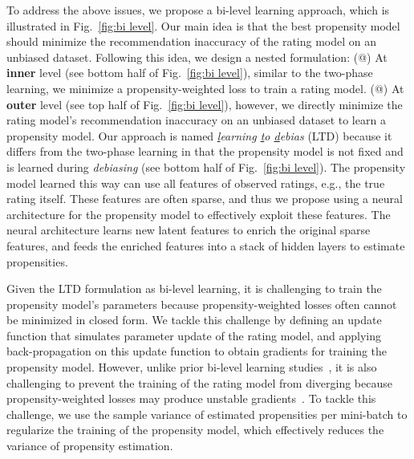 \documentclass[letterpaper]{article} %
\makeatletter
\newcommand*{\myroman}[1]{\expandafter\@slowromancap\romannumeral #1@}
\makeatother
\begin{document}
To address the above issues, we propose a bi-level learning approach, which is illustrated in Fig.~\ref{fig:bi level}.
Our main idea is that the best propensity model should minimize the recommendation inaccuracy of the rating model on an unbiased dataset.
Following this idea, we design a nested formulation:
(\myroman{1}) At \textbf{inner} level (see bottom half of Fig.~\ref{fig:bi level}), similar to the two-phase learning, we minimize a propensity-weighted loss to train a rating model.
(\myroman{2}) At \textbf{outer} level (see top half of Fig.~\ref{fig:bi level}), however, we directly minimize the rating model's recommendation inaccuracy on an unbiased dataset to learn a propensity model.
Our approach is named \emph{\underline{l}earning \underline{t}o \underline{d}ebias} (LTD) because it differs from the two-phase learning in that the propensity model is not fixed and is learned during \emph{debiasing} (see bottom half of Fig.~\ref{fig:bi level}).
The propensity model learned this way can use all features of observed ratings, e.g., the true rating itself.
These features are often sparse, and thus we propose using a neural architecture for the propensity model to effectively exploit these features.
The neural architecture learns new latent features to enrich the original sparse features, and feeds the enriched features into a stack of hidden layers to estimate propensities.

Given the LTD formulation as bi-level learning, it is challenging to train the propensity model's parameters because propensity-weighted losses often cannot be minimized in closed form.
We tackle this challenge by defining an update function that simulates parameter update of the rating model, and applying back-propagation on this update function to obtain gradients for training the propensity model.
However, unlike prior bi-level learning studies~\cite{franceschi2017forward}, it is also challenging to prevent the training of the rating model from diverging because propensity-weighted losses may produce unstable gradients~\cite{swaminathan2015counterfactual}.
To tackle this challenge, we use the sample variance of estimated propensities per mini-batch to regularize the training of the propensity model, which effectively reduces the variance of propensity estimation.
\end{document}
